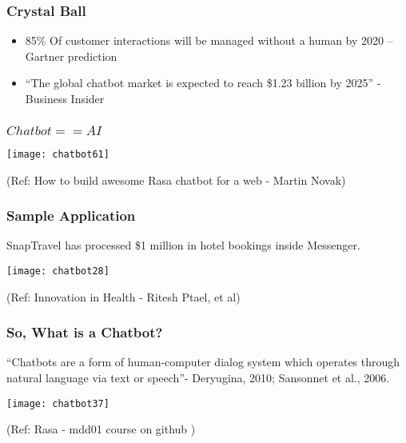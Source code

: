 \begin{frame}[fragile]\frametitle{Crystal Ball}

\begin{itemize}
\item 85\% Of customer interactions will be managed without a human by 2020 – Gartner prediction

\item ``The global chatbot market is expected to reach \$1.23 billion by 2025'' - Business Insider
\end{itemize}

\end{frame}

\begin{frame}[fragile]\frametitle{$Chatbot == AI$}


\begin{center}
\texttt{[image: chatbot61]}
\end{center}

{\tiny (Ref: How to build awesome Rasa chatbot for a web - Martin Novak)}


\end{frame}


\begin{frame}[fragile]\frametitle{Sample Application}

SnapTravel has processed \$1 million in hotel bookings inside Messenger.


\begin{center}
\texttt{[image: chatbot28]}
\end{center}

{\tiny (Ref: Innovation in Health - Ritesh Ptael, et al)}


\end{frame}



\begin{frame}[fragile]\frametitle{So, What is a Chatbot?}

``Chatbots are a form of human-computer dialog system which operates 
through natural language via text or speech''- Deryugina, 2010; Sansonnet et al., 2006.

\begin{center}
\texttt{[image: chatbot37]}

{\tiny (Ref: Rasa - mdd01 course on github )}

\end{center}

\end{frame}


